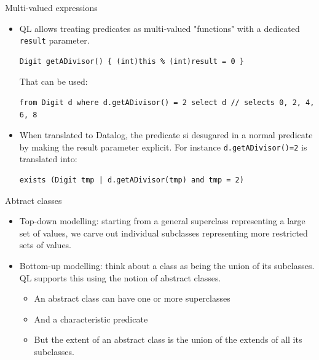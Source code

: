 \documentclass[usenames,dvipsnames]{beamer}
\begin{document}
\begin{frame}[fragile]{Multi-valued expressions}
\begin{itemize}
\item QL allows treating predicates as multi-valued "functions" with a dedicated \texttt{result} parameter.
\begin{lstlisting}[language=JastAdd]
Digit getADivisor() { (int)this % (int)result = 0 }
\end{lstlisting}
That can be used:
\begin{lstlisting}[language=JastAdd]
from Digit d where d.getADivisor() = 2 select d // selects 0, 2, 4, 6, 8
\end{lstlisting}

\item When translated to Datalog, the predicate si desugared in a normal predicate by making the result parameter explicit. For instance \texttt{d.getADivisor()=2} is translated into:
\begin{lstlisting}[language=JastAdd]
exists (Digit tmp | d.getADivisor(tmp) and tmp = 2)
\end{lstlisting}
\end{itemize}
\end{frame}


\begin{frame}{Abtract classes}
\begin{itemize}
\item Top-down modelling: starting from a general superclass representing a large set of values, we carve out individual subclasses representing more restricted sets of values.

\item Bottom-up modelling: think about a class as being the union of its subclasses. QL supports this using the notion of abstract classes.
\begin{itemize}
\item An abstract class can have one or more superclasses
\item And a characteristic predicate
\item But the extent of an abstract class is the union of the extends of all its subclasses.
\end{itemize}
\end{itemize}
\end{frame}
\end{document}
